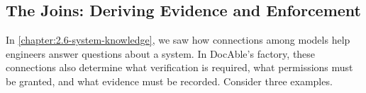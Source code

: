 \subsection{The Joins: Deriving Evidence and Enforcement}\label{heading:the-joins-what-the-factory-can-derive-and-enforce}


In \cref{chapter:2.6-system-knowledge}, we saw how connections among models help engineers answer questions about a system. In DocAble’s factory, these connections also determine what verification is required, what permissions must be granted, and what evidence must be recorded. Consider three examples.




